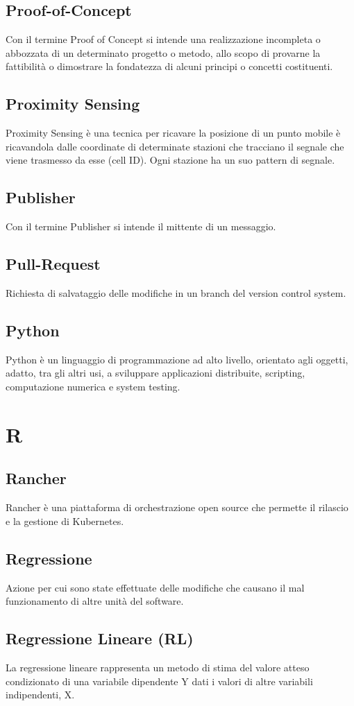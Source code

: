 \subsection{Proof-of-Concept }  Con il termine Proof of Concept si intende una realizzazione incompleta o abbozzata di un determinato progetto o metodo, allo scopo di provarne la fattibilità o dimostrare la fondatezza di alcuni principi o concetti costituenti.
\subsection{Proximity Sensing}  Proximity Sensing è una tecnica per ricavare la posizione di un punto mobile è ricavandola dalle coordinate di determinate stazioni che tracciano il segnale che viene trasmesso da esse (cell ID). Ogni stazione ha un suo pattern di segnale.
\subsection{Publisher}  Con il termine Publisher si intende il mittente di un messaggio.
\subsection{Pull-Request}  Richiesta di salvataggio delle modifiche in un branch del version control system.
\subsection{Python}  Python è un linguaggio di programmazione ad alto livello, orientato agli oggetti, adatto, tra gli altri usi, a sviluppare applicazioni distribuite, scripting, computazione numerica e system testing.

\newpage \section{R}
\subsection{Rancher}  Rancher è una piattaforma di orchestrazione open source che permette il rilascio e la gestione di Kubernetes.
\subsection{Regressione}  Azione per cui sono state effettuate delle modifiche che causano il mal funzionamento di altre unità del software.
\subsection{Regressione Lineare (RL)}  La regressione lineare rappresenta un metodo di stima del valore atteso condizionato di una variabile dipendente Y dati i valori di altre variabili indipendenti, X.
